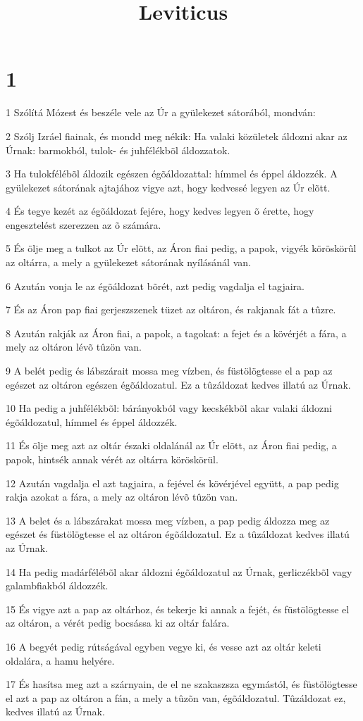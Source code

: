 

\title{Leviticus}


\chapter{1}

\par 1 Szólítá Mózest és beszéle vele az Úr a gyülekezet sátorából, mondván:
\par 2 Szólj Izráel fiainak, és mondd meg nékik: Ha valaki közületek áldozni akar az Úrnak: barmokból, tulok- és juhfélékbõl áldozzatok.
\par 3 Ha tulokfélébõl áldozik egészen égõáldozattal: hímmel és éppel áldozzék. A gyülekezet sátorának ajtajához vigye azt, hogy kedvessé legyen az Úr elõtt.
\par 4 És tegye kezét az égõáldozat fejére, hogy kedves legyen õ érette, hogy engesztelést szerezzen az õ számára.
\par 5 És ölje meg a tulkot az Úr elõtt, az Áron fiai pedig, a papok, vigyék köröskörûl az oltárra, a mely a gyülekezet sátorának nyílásánál van.
\par 6 Azután vonja le az égõáldozat bõrét, azt pedig vagdalja el tagjaira.
\par 7 És az Áron pap fiai gerjeszszenek tüzet az oltáron, és rakjanak fát a tûzre.
\par 8 Azután rakják az Áron fiai, a papok, a tagokat: a fejet és a kövérjét a fára, a mely az oltáron lévõ tûzön van.
\par 9 A belét pedig és lábszárait mossa meg vízben, és füstölögtesse el a pap az egészet az oltáron egészen égõáldozatul. Ez a tûzáldozat kedves illatú az Úrnak.
\par 10 Ha pedig a juhfélékbõl: bárányokból vagy kecskékbõl akar valaki áldozni égõáldozatul, hímmel és éppel áldozzék.
\par 11 És ölje meg azt az oltár északi oldalánál az Úr elõtt, az Áron fiai pedig, a papok, hintsék annak vérét az oltárra köröskörül.
\par 12 Azután vagdalja el azt tagjaira, a fejével és kövérjével együtt, a pap pedig rakja azokat a fára, a mely az oltáron lévõ tûzön van.
\par 13 A belet és a lábszárakat mossa meg vízben, a pap pedig áldozza meg az egészet és füstölögtesse el az oltáron égõáldozatul. Ez a tûzáldozat kedves illatú az Úrnak.
\par 14 Ha pedig madárfélébõl akar áldozni égõáldozatul az Úrnak, gerliczékbõl vagy galambfiakból áldozzék.
\par 15 És vigye azt a pap az oltárhoz, és tekerje ki annak a fejét, és füstölögtesse el az oltáron, a vérét pedig bocsássa ki az oltár falára.
\par 16 A begyét pedig rútságával egyben vegye ki, és vesse azt az oltár keleti oldalára, a hamu helyére.
\par 17 És hasítsa meg azt a szárnyain, de el ne szakaszsza egymástól, és füstölögtesse el azt a pap az oltáron a fán, a mely a tûzõn van, égõáldozatul. Tûzáldozat ez, kedves illatú az Úrnak.

